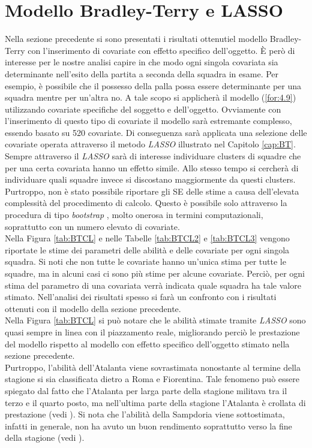 \section{Modello Bradley-Terry e LASSO}
Nella sezione precedente si sono presentati i risultati ottenutiel modello Bradley-Terry con l'inserimento di covariate con effetto specifico dell'oggetto. È però di interesse per le nostre analisi capire in che modo ogni singola covariata sia determinante nell'esito della partita a seconda della squadra in esame. Per esempio, è possibile che il possesso della palla possa essere determinante per una squadra mentre per un'altra no. A tale scopo si applicherà il modello (\ref{for:4.9}) utilizzando covariate specifiche del soggetto e dell'oggetto. Ovviamente con l'inserimento di questo tipo di covariate il modello sarà estremante complesso, essendo basato su 520 covariate. Di conseguenza sarà applicata una selezione delle covariate operata attraverso il metodo \emph{LASSO} illustrato nel Capitolo \ref{cap:BT}. Sempre attraverso il \emph{LASSO} sarà di interesse individuare clusters di squadre che per una certa covariata hanno un effetto simile. Allo stesso tempo si cercherà di individuare quali squadre invece si discostano maggiormente da questi clusters.\\
Purtroppo, non è stato possibile riportare gli SE delle stime a causa dell'elevata complessità del procedimento di calcolo. Questo è possibile solo attraverso la procedura di tipo \emph{bootstrap} \autocite{henderson2005bootstrap}, molto onerosa in termini computazionali, soprattutto con un numero elevato di covariate.\\
Nella Figura \ref{tab:BTCL} e nelle Tabelle \ref{tab:BTCL2} e \ref{tab:BTCL3} vengono riportate le stime dei parametri delle abilità e delle covariate per ogni singola squadra. Si noti che non tutte le covariate hanno un’unica stima per tutte le squadre, ma in alcuni casi ci sono più stime per alcune covariate. Perciò, per ogni stima del parametro di una covariata verrà indicata quale squadra ha tale valore stimato. Nell'analisi dei risultati spesso si farà un confronto con i risultati ottenuti con il modello della sezione precedente.\\%
Nella Figura \ref{tab:BTCL} si può notare che le abilità stimate tramite \emph{LASSO} sono quasi sempre  in linea con il piazzamento reale, migliorando perciò le prestazione del modello rispetto al modello con effetto specifico dell'oggetto stimato nella sezione precedente.\\
Purtroppo, l'abilità dell'Atalanta viene sovrastimata nonostante al termine della stagione si sia classificata dietro a Roma e Fiorentina. Tale fenomeno può essere spiegato dal fatto che l'Atalanta per larga parte della stagione militava tra il terzo e il quarto posto, ma nell'ultima parte della stagione l'Atalanta è crollata di prestazione (vedi \textit{\cite{storyAta}}). Si nota che l'abilità della Sampdoria viene sottostimata, infatti in generale, non ha avuto un buon rendimento soprattutto verso la fine della stagione (vedi \textit{\cite{storySamp}}).\\
